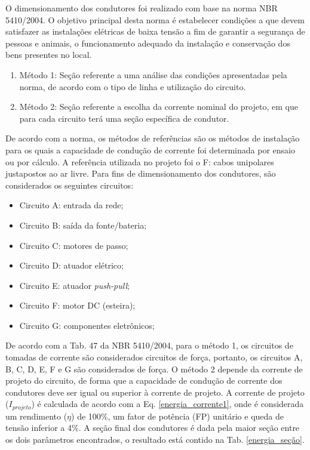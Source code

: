 O dimensionamento dos condutores foi realizado com base na norma NBR 5410/2004. O objetivo principal desta norma é estabelecer condições a que devem satisfazer as instalações elétricas de baixa tensão a fim de garantir a segurança de pessoas e animais, o funcionamento adequado da instalação e conservação dos bens presentes no local. 

\begin{enumerate}
    \item Método 1: Seção referente a uma análise das condições apresentadas pela norma, de acordo com o tipo de linha e utilização do circuito. 
    
    \item Método 2: Seção referente a escolha da corrente nominal do projeto, em que para cada circuito terá uma seção específica de condutor. 
\end{enumerate}

De acordo com a norma, os métodos de referências são os métodos de instalação para os quais a capacidade de condução de corrente foi determinada por ensaio ou por cálculo. A referência utilizada no projeto foi o F: cabos unipolares justapostos ao ar livre. Para fins de dimensionamento dos condutores, são considerados os seguintes circuitos:

\begin{itemize}
    \item Circuito A: entrada da rede;
    
    \item Circuito B: saída da fonte/bateria;
    
    \item Circuito C: motores de passo;
    
    \item Circuito D: atuador elétrico;
    
    \item Circuito E: atuador \textit{push-pull};
    
    \item Circuito F: motor DC (esteira);
    
    \item Circuito G: componentes eletrônicos;
\end{itemize}

De acordo com a Tab. 47 da NBR 5410/2004, para o método 1, os circuitos de tomadas de corrente são considerados circuitos de força, portanto, os circuitos A, B, C, D, E, F e G são considerados de força. O método 2 depende da corrente de projeto do circuito, de forma que a capacidade de condução de corrente dos condutores deve ser igual ou superior à corrente de projeto. A corrente de projeto ($I_{projeto}$) é calculada de acordo com a Eq. \ref{energia_corrente1}, onde é considerada um rendimento ($\eta$) de 100\%, um fator de potência (FP) unitário e queda de tensão inferior a 4\%. A seção final dos condutores é dada pela maior seção entre os dois parâmetros encontrados, o resultado está contido na Tab. \ref{energia_seção}.
    
